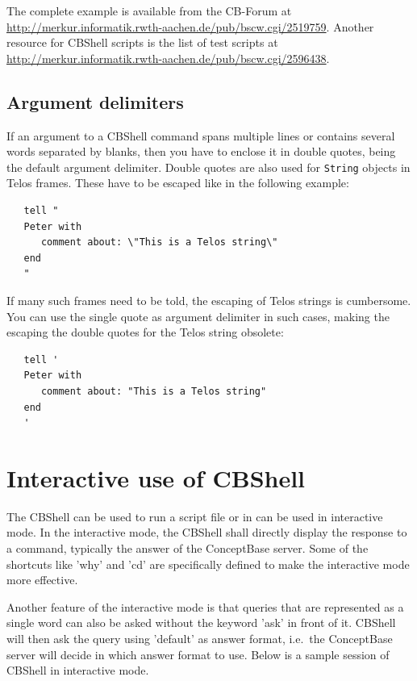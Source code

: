 The complete example is available from the CB-Forum at \url{http://merkur.informatik.rwth-aachen.de/pub/bscw.cgi/2519759}.
Another resource for CBShell scripts is the list of test scripts at
\url{http://merkur.informatik.rwth-aachen.de/pub/bscw.cgi/2596438}.


\subsection{Argument delimiters}
\label{sec:argdelim}

If an argument to a CBShell command spans multiple lines or contains several words separated by
blanks, then you have to enclose it in double quotes, being the default argument delimiter.
Double quotes are also used for {\tt String}  objects in Telos frames. These have to be
escaped like in the following example:

\begin{verbatim}
   tell "
   Peter with 
      comment about: \"This is a Telos string\"
   end
   "
\end{verbatim}


If many such frames need to be told, the escaping of Telos strings is cumbersome.
You can use the single quote as argument delimiter in such cases, making the
escaping the double quotes for the Telos string obsolete:

\begin{verbatim}
   tell '
   Peter with 
      comment about: "This is a Telos string"
   end
   '
\end{verbatim}



\section{Interactive use of CBShell}
\label{sec:cbshellinteractive}

The CBShell can be used to run a script file or in can be used in interactive mode.
In the interactive mode, the CBShell shall directly display the response to a command,
typically the answer of the ConceptBase server. Some of the shortcuts like 'why' and
'cd' are specifically defined to make the interactive mode more effective.

Another feature of the interactive mode is that queries that are represented as a single 
word can also be asked without the keyword 'ask' in front of it. CBShell will then ask
the query using 'default' as answer format, i.e.\ the ConceptBase server will decide
in which answer format to use. Below is a sample session of CBShell in interactive mode.

